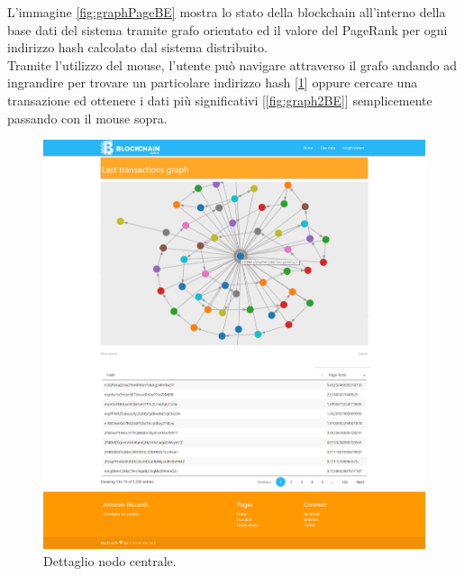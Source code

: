L'immagine \ref{fig:graphPageBE} mostra lo stato della blockchain all'interno della base dati del sistema tramite grafo orientato ed il valore del PageRank per ogni indirizzo hash calcolato dal sistema distribuito.
\\Tramite l'utilizzo del mouse, l'utente può navigare attraverso il grafo andando ad ingrandire per trovare un particolare indirizzo hash [\ref{fig:graph1BE}] oppure cercare una transazione ed ottenere i dati più significativi [\ref{fig:graph2BE}] semplicemente passando con il mouse sopra.
\begin{figure}[H]
	\centering
	\includegraphics[width=\textwidth, height=0.70\textheight]{images/lastGraph-1.jpg}
	\caption{Dettaglio nodo centrale.}
	\label{fig:graph1BE}
\end{figure}
